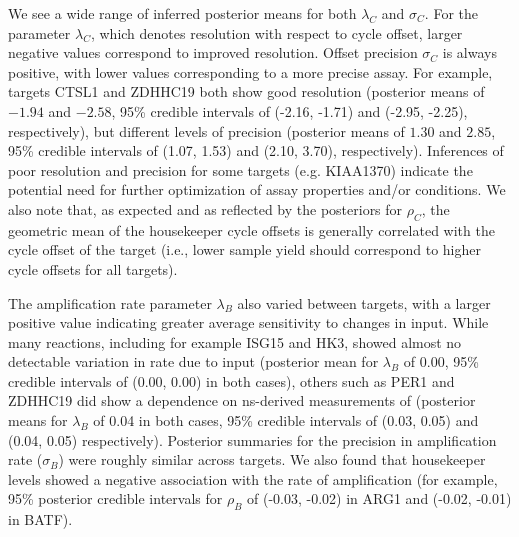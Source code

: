 \documentclass[../thesis.tex]{subfiles}
\begin{document}
We see a wide range of inferred posterior means for both $\lambda_C$ and $\sigma_C$. For the parameter $\lambda_C$, which denotes resolution with respect to cycle offset, larger negative values correspond to improved resolution. Offset precision $\sigma_C$ is always positive, with lower values corresponding to a more precise assay. For example, targets {CTSL1} and {ZDHHC19} both show good resolution (posterior means of $-1.94$ and $-2.58$, 95\% credible intervals of (-2.16, -1.71) and (-2.95, -2.25), respectively), but different levels of precision (posterior means of $1.30$ and $2.85$, 95\% credible intervals of (1.07, 1.53) and (2.10, 3.70), respectively). Inferences of poor resolution and precision for some targets (e.g. {KIAA1370}) indicate the potential need for further optimization of assay properties and/or conditions. We also note that, as expected and as reflected by the posteriors for $\rho_C$, the geometric mean of the housekeeper cycle offsets is generally correlated with the cycle offset of the target (i.e., lower sample yield should correspond to higher cycle offsets for all targets). 

The amplification rate parameter $\lambda_B$ also varied between targets, with a larger positive value indicating greater average sensitivity to changes in  input. While many reactions, including for example {ISG15} and {HK3}, showed almost no detectable variation in rate due to  input (posterior mean for $\lambda_B$ of 0.00, 95\% credible intervals of (0.00, 0.00) in both cases), others such as {PER1} and {ZDHHC19} did show a dependence on \gls{ns}-derived measurements of  (posterior means for $\lambda_B$ of 0.04 in both cases, 95\% credible intervals of (0.03, 0.05) and (0.04, 0.05) respectively). Posterior summaries for the precision in amplification rate ($\sigma_{B}$) were roughly similar across targets. We also found that housekeeper levels showed a negative association with the rate of amplification (for example, 95\% posterior credible intervals for $\rho_B$ of (-0.03, -0.02) in ARG1 and (-0.02, -0.01) in BATF).
\end{document}
